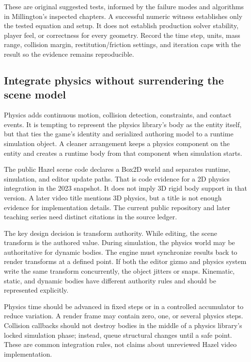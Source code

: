 These are original suggested tests, informed by the failure modes and algorithms in Millington's inspected chapters. A successful numeric witness establishes only the tested equation and setup. It does not establish production solver stability, player feel, or correctness for every geometry. Record the time step, units, mass range, collision margin, restitution/friction settings, and iteration caps with the result so the evidence remains reproducible.

\subsection{Integrate physics without surrendering the scene model}\label{06-engine-ii-ch033-integrate-physics-without-surrendering-the-scene-model}

Physics adds continuous motion, collision detection, constraints, and contact events. It is tempting to represent the physics library's body as the entity itself, but that ties the game's identity and serialized authoring model to a runtime simulation object. A cleaner arrangement keeps a physics component on the entity and creates a runtime body from that component when simulation starts.

The public Hazel scene code declares a Box2D world and separates runtime, simulation, and editor update paths. That is code evidence for a 2D physics integration in the 2023 snapshot. It does not imply 3D rigid body support in that version. A later video title mentions 3D physics, but a title is not enough evidence for implementation details. The current public repository and later teaching series need distinct citations in the source ledger.

The key design decision is transform authority. While editing, the scene transform is the authored value. During simulation, the physics world may be authoritative for dynamic bodies. The engine must synchronize results back to render transforms at a defined point. If both the editor gizmo and physics system write the same transform concurrently, the object jitters or snaps. Kinematic, static, and dynamic bodies have different authority rules and should be represented explicitly.

Physics time should be advanced in fixed steps or in a controlled accumulator to reduce variation. A render frame may contain zero, one, or several physics steps. Collision callbacks should not destroy bodies in the middle of a physics library's locked simulation phase; instead, queue structural changes until a safe point. These are common integration rules, not claims about unreviewed Hazel video implementation.

